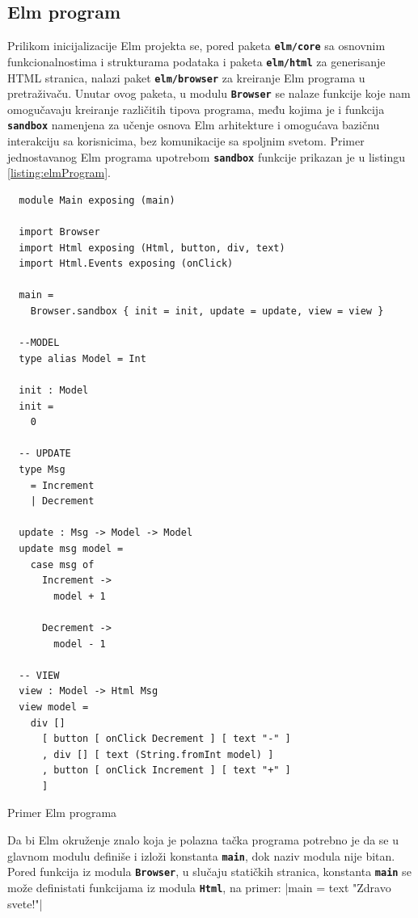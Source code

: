 \documentclass[12pt,oneside]{memoir}
\begin{document}
\subsection{Elm program}
Prilikom inicijalizacije Elm projekta se, pored paketa \texttt{\textbf{elm/core}} sa
osnovnim funkcionalnostima i strukturama podataka i paketa \texttt{\textbf{elm/html}} za
generisanje HTML stranica, nalazi paket \texttt{\textbf{elm/browser}} za kreiranje Elm
programa u pretraživaču. Unutar ovog paketa, u modulu \texttt{\textbf{Browser}} se nalaze
funkcije koje nam omogučavaju kreiranje različitih tipova programa, među kojima je i
funkcija \texttt{\textbf{sandbox}} namenjena za učenje osnova Elm arhitekture i
omogućava bazičnu interakciju sa korisnicima, bez komunikacije sa spoljnim svetom.
Primer jednostavanog Elm programa upotrebom \texttt{\textbf{sandbox}} funkcije prikazan
je u listingu \ref{listing:elmProgram}.
\begin{listing}[h!]
\begin{verbatim}
  module Main exposing (main)

  import Browser
  import Html exposing (Html, button, div, text)
  import Html.Events exposing (onClick)
  
  main =
    Browser.sandbox { init = init, update = update, view = view }

  --MODEL
  type alias Model = Int
  
  init : Model
  init =
    0
  
  -- UPDATE
  type Msg
    = Increment
    | Decrement
  
  update : Msg -> Model -> Model
  update msg model =
    case msg of
      Increment ->
        model + 1
  
      Decrement ->
        model - 1
  
  -- VIEW
  view : Model -> Html Msg
  view model =
    div []
      [ button [ onClick Decrement ] [ text "-" ]
      , div [] [ text (String.fromInt model) ]
      , button [ onClick Increment ] [ text "+" ]
      ]
\end{verbatim}
\caption{Primer Elm programa}
\label{listing:elmProgram}
\end{listing}

Da bi Elm okruženje znalo koja je polazna tačka programa potrebno je da se u glavnom
modulu definiše i izloži konstanta \textbf{\texttt{main}}, dok naziv modula nije bitan.
Pored funkcija iz modula \texttt{\textbf{Browser}}, u slučaju statičkih stranica, konstanta 
\textbf{\texttt{main}} se može definistati funkcijama iz modula \texttt{\textbf{Html}},
na primer: |main = text "Zdravo svete!"|
\end{document}
